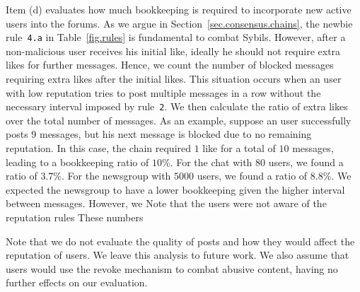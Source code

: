\documentclass[10pt,journal,compsoc]{IEEEtran}
\newcommand{\code}[1]  {\texttt{\footnotesize{#1}}}
\begin{document}
Item (d) evaluates how much bookkeeping is required to incorporate new active
users into the forums.
As we argue in Section~\ref{sec.consensus.chains}, the newbie rule~\code{4.a}
in Table~\ref{fig.rules} is fundamental to combat Sybils.
However, after a non-malicious user receives his initial like, ideally he
should not require extra likes for further messages.
%
Hence, we count the number of blocked messages requiring extra likes after the
initial likes.
This situation occurs when an user with low reputation tries to post multiple
messages in a row without the necessary interval imposed by rule~\code{2}.
We then calculate the ratio of extra likes over the total number of messages.
As an example, suppose an user successfully posts 9 messages, but his next
message is blocked due to no remaining reputation.
In this case, the chain required $1$ like for a total of $10$ messages, leading
to a bookkeeping ratio of $10\%$.
%
For the chat with $80$ users, we found a ratio of $3.7\%$.
For the newsgroup with $5000$ users, we found a ratio of $8.8\%$.
%
We expected the newsgroup to have a lower bookkeeping given the higher interval
between messages.
However, we
%
Note that the users were not aware of the reputation rules These numbers

Note that we do not evaluate the quality of posts and how they would affect the
reputation of users.
We leave this analysis to future work.
We also assume that users would use the revoke mechanism to combat abusive
content, having no further effects on our evaluation.
\end{document}
